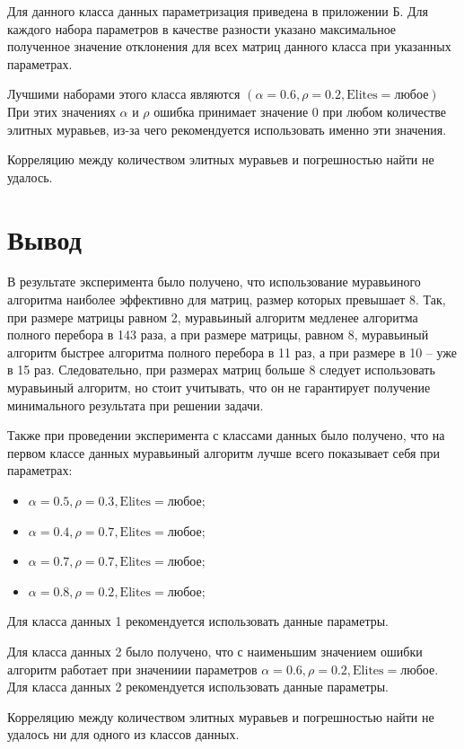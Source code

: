 Для данного класса данных параметризация приведена в приложении Б.
Для каждого набора параметров в качестве разности указано максимальное полученное значение отклонения для всех матриц данного класса при указанных параметрах.

Лучшими наборами этого класса являются $(\alpha = 0.6, \rho = 0.2, \text{Elites} = \text{любое})$
При этих значениях $\alpha$ и $\rho$ ошибка принимает значение 0 при любом количестве элитных муравьев, из-за чего рекомендуется использовать именно эти значения.

Корреляцию между количеством элитных муравьев и погрешностью найти не удалось.

\section*{Вывод}

В результате эксперимента было получено, что использование муравьиного алгоритма наиболее эффективно для матриц, размер которых превышает 8.
Так, при размере матрицы равном 2, муравьиный алгоритм медленее алгоритма полного перебора в 143 раза, а при размере матрицы, равном 8, муравьиный алгоритм быстрее алгоритма полного перебора в 11 раз, а при размере в 10 -- уже в 15 раз.
Следовательно, при размерах матриц больше 8 следует использовать муравьиный алгоритм, но стоит учитывать, что он не гарантирует получение минимального результата при решении задачи.

Также при проведении эксперимента с классами данных было получено, что на первом классе данных муравьиный алгоритм лучше всего показывает себя при параметрах:
\begin{itemize}[label=---]
	\item $\alpha = 0.5, \rho = 0.3, \text{Elites} = \text{любое}$;
	\item $\alpha = 0.4, \rho = 0.7, \text{Elites} = \text{любое}$;
	\item $\alpha = 0.7, \rho = 0.7, \text{Elites} = \text{любое}$;
	\item $\alpha = 0.8, \rho = 0.2, \text{Elites} = \text{любое}$;
\end{itemize}

Для класса данных 1 рекомендуется использовать данные параметры.

Для класса данных 2 было получено, что с наименьшим значением ошибки алгоритм работает при значениии параметров $\alpha = 0.6, \rho = 0.2, \text{Elites} = \text{любое}$.
Для класса данных 2 рекомендуется использовать данные параметры.

Корреляцию между количеством элитных муравьев и погрешностью найти не удалось ни для одного из классов данных.
